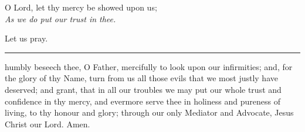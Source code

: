     O Lord, let thy mercy be showed upon us;\\
    \textit{As we do put our trust in thee.}
    \par
Let us pray.
\begin{center}
	\rule{50ex}{.25mm}
\end{center}
 humbly beseech thee, O Father, mercifully to look upon our infirmities; and, for the glory of thy Name, turn from us all those evils that we most justly have deserved; and grant, that in all our troubles we may put our whole trust and confidence in thy mercy, and evermore serve thee in holiness and pureness of living, to thy honour and glory; through our only Mediator and Advocate, Jesus Christ our Lord. Amen.
